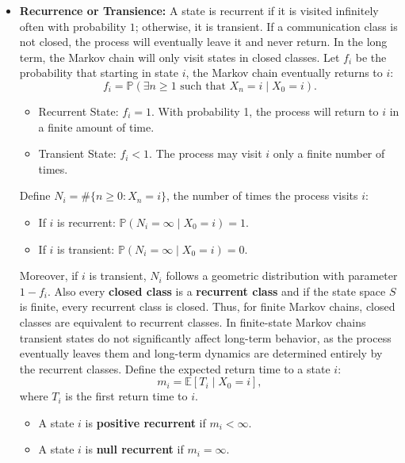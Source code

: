 \begin{itemize}
    \item \textbf{Recurrence or Transience:} A state is recurrent if it is visited infinitely often with probability \( 1 \); otherwise, it is transient. If a communication class is not closed, the process will eventually leave it and never return. In the long term, the Markov chain will only visit states in closed classes. Let \( f_i \) be the probability that starting in state \( i \), the Markov chain eventually returns to \( i \):
    \[
    f_i = \mathbb{P}(\exists n \geq 1 \text{ such that } X_n = i \mid X_0 = i).
    \]
        \begin{itemize}
            \item Recurrent State: \( f_i = 1 \). With probability 1, the process will return to \( i \) in a finite amount of time.
            \item Transient State: \( f_i < 1 \). The process may visit \( i \) only a finite number of times.
        \end{itemize}
    Define \( N_i = \#\{n \geq 0 : X_n = i\} \), the number of times the process visits \( i \):  
        \begin{itemize}
            \item If \( i \) is recurrent: \( \mathbb{P}(N_i = \infty \mid X_0 = i) = 1 \).
            \item If \( i \) is transient: \( \mathbb{P}(N_i = \infty \mid X_0 = i) = 0 \).
        \end{itemize}
    Moreover, if \( i \) is transient, \( N_i \) follows a geometric distribution with parameter \( 1-f_i \). \newline
    Also every \textbf{closed class} is a \textbf{recurrent class} and if the state space \( S \) is finite, every recurrent class is closed. Thus, for finite Markov chains, closed classes are equivalent to recurrent classes. In finite-state Markov chains transient states do not significantly affect long-term behavior, as the process eventually leaves them and long-term dynamics are determined entirely by the recurrent classes. \newline 
    Define the expected return time to a state \( i \):
    \[
    m_i = \mathbb{E}[T_i \mid X_0 = i],
    \]
    where \( T_i \) is the first return time to \( i \).  
    \begin{itemize}
        \item A state \( i \) is \textbf{positive recurrent} if \( m_i < \infty \).
        \item A state \( i \) is \textbf{null recurrent} if \( m_i = \infty \).
    \end{itemize}
    

\end{itemize}
